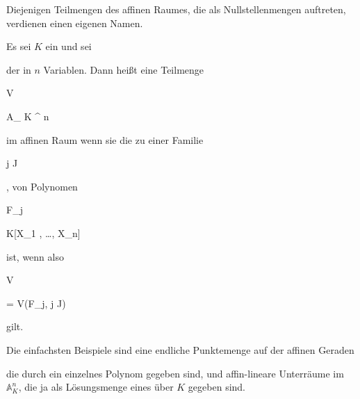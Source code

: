 Diejenigen Teilmengen des affinen Raumes, die als Nullstellenmengen auftreten, verdienen einen eigenen Namen.




{}


{


Es sei $K$ ein
und sei


 der
in $n$ Variablen. Dann heißt eine Teilmenge


\mavergleichskette


{\vergleichskette


{ V
}


{ \subseteq }{ { {\mathbb A}_{  K }^{  n   } }
}


{  }{
}


{    }{
}


{   }{
}


}
{}{}{}
im affinen Raum  wenn sie die
zu einer Familie


 {}


 {j \in J} {}


 {} {} {} {,}
von Polynomen


\mavergleichskette


{\vergleichskette


{ F_j
}


{ \in }{ K[X_1 , \ldots ,  X_n]
}


{  }{
}


{    }{
}


{   }{
}


}
{}{}{}
ist, wenn also


\mavergleichskette


{\vergleichskette


{ V
}


{ = }{ V(F_j, j \in J)
}


{  }{
}


{    }{
}


{   }{
}


}
{}{}{}
gilt.


}


Die einfachsten Beispiele sind eine endliche Punktemenge auf der affinen Geraden


 die durch ein einzelnes Polynom gegeben sind, und affin-lineare Unterräume im ${ {\mathbb A}_{ K }^{ n  } }$, die ja als Lösungsmenge eines
über $K$ gegeben sind.


